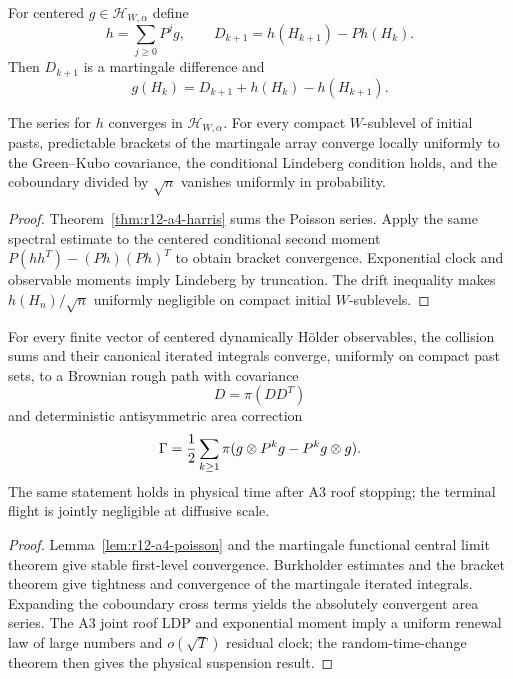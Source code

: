 For centered $g\in\mathcal H_{W,\alpha}$ define
\[
 h=\sum_{j\ge0}P^jg,
 \qquad
 D_{k+1}=h(H_{k+1})-Ph(H_k).
\]
Then $D_{k+1}$ is a martingale difference and
\[
 g(H_k)=D_{k+1}+h(H_k)-h(H_{k+1}).
\]

\begin{lemma}
\label{lem:r12-a4-poisson}
The series for $h$ converges in $\mathcal H_{W,\alpha}$.  For every compact
$W$-sublevel of initial pasts, predictable brackets of the martingale array
converge locally uniformly to the Green--Kubo covariance, the conditional
Lindeberg condition holds, and the coboundary divided by $\sqrt n$ vanishes
uniformly in probability.
\end{lemma}

\begin{proof}
Theorem~\ref{thm:r12-a4-harris} sums the Poisson series.  Apply the same
spectral estimate to the centered conditional second moment
$P(hh^T)-(Ph)(Ph)^T$ to obtain bracket convergence.  Exponential clock and
observable moments imply Lindeberg by truncation.  The drift inequality makes
$h(H_n)/\sqrt n$ uniformly negligible on compact initial $W$-sublevels.
\end{proof}

\begin{theorem}
\label{thm:r12-a4-rough}
For every finite vector of centered dynamically H\"older observables, the
collision sums and their canonical iterated integrals converge, uniformly on
compact past sets, to a Brownian rough path with covariance
\[
 D=\pi(DD^T)
\]
and deterministic antisymmetric area correction
\[
 \Gamma={1\over2}\sum_{k\ge1}
 \pi(g\otimes P^kg-P^kg\otimes g).
\]
The same statement holds in physical time after A3 roof stopping; the terminal
flight is jointly negligible at diffusive scale.
\end{theorem}

\begin{proof}
Lemma~\ref{lem:r12-a4-poisson} and the martingale functional central limit
theorem give stable first-level convergence.  Burkholder estimates and the
bracket theorem give tightness and convergence of the martingale iterated
integrals.  Expanding the coboundary cross terms yields the absolutely
convergent area series.  The A3 joint roof LDP and exponential moment imply a
uniform renewal law of large numbers and $o(\sqrt T)$ residual clock; the
random-time-change theorem then gives the physical suspension result.
\end{proof}

